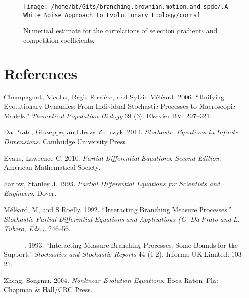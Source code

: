 \documentclass[]{article}
\begin{document}
\begin{figure}

{\centering \texttt{[image: /home/bb/Gits/branching.brownian.motion.and.spde/.A White Noise Approach To Evolutionary Ecology/corrs]} 

}

\caption{\label{num_corr} Numerical estimate for the correlations of selection gradients and competition coefficients.}\label{fig:unnamed-chunk-1}
\end{figure}

\newpage

\hypertarget{references}{%
\section*{References}\label{references}}

\hypertarget{refs}{}
\leavevmode\hypertarget{ref-Champagnat2006}{}%
Champagnat, Nicolas, Régis Ferrière, and Sylvie Méléard. 2006.
``Unifying Evolutionary Dynamics: From Individual Stochastic Processes
to Macroscopic Models.'' \emph{Theoretical Population Biology} 69 (3).
Elsevier BV: 297--321.

\leavevmode\hypertarget{ref-DaPrato2014}{}%
Da Prato, Giuseppe, and Jerzy Zabczyk. 2014. \emph{Stochastic Equations
in Infinite Dimensions}. Cambridge University Press.

\leavevmode\hypertarget{ref-lawrenceevans2010}{}%
Evans, Lawrence C. 2010. \emph{Partial Differential Equations: Second
Edition}. American Mathematical Society.

\leavevmode\hypertarget{ref-stanleyfarlow1993}{}%
Farlow, Stanley J. 1993. \emph{Partial Differential Equations for
Scientists and Engineers}. Dover.

\leavevmode\hypertarget{ref-meleard1992interacting}{}%
Méléard, M, and S Roelly. 1992. ``Interacting Branching Measure
Processes.'' \emph{Stochastic Partial Differential Equations and
Applications (G. Da Prato and L. Tubaro, Eds.)}, 246--56.

\leavevmode\hypertarget{ref-Mlard1993}{}%
---------. 1993. ``Interacting Measure Branching Processes. Some Bounds
for the Support.'' \emph{Stochastics and Stochastic Reports} 44 (1-2).
Informa UK Limited: 103--21.

\leavevmode\hypertarget{ref-zheng2004nonlinear}{}%
Zheng, Songmu. 2004. \emph{Nonlinear Evolution Equations}. Boca Raton,
Fla: Chapman \& Hall/CRC Press.
\end{document}
